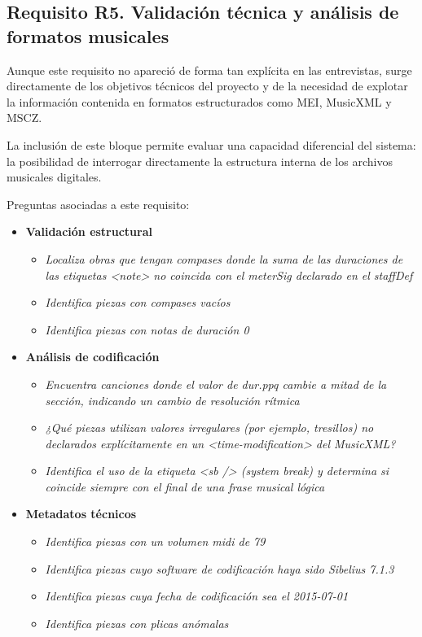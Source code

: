 \subsection{Requisito R5. Validación técnica y análisis de formatos musicales}
Aunque este requisito no apareció de forma tan explícita en las entrevistas, surge directamente de los objetivos técnicos del proyecto y de la necesidad de explotar la información contenida en formatos estructurados como MEI, MusicXML y MSCZ.

La inclusión de este bloque permite evaluar una capacidad diferencial del sistema: la posibilidad de interrogar directamente la estructura interna de los archivos musicales digitales.

Preguntas asociadas a este requisito:
\begin{itemize}
    \item \textbf{Validación estructural}
    \begin{itemize}
    \item \textit{Localiza obras que tengan compases donde la suma de las duraciones de las etiquetas <note> no coincida con el meterSig declarado en el staffDef}
    \item \textit{Identifica piezas con compases vacíos}
    \item \textit{Identifica piezas con notas de duración 0}
    \end{itemize}
    \item \textbf{Análisis de codificación}
    \begin{itemize}
    \item \textit{Encuentra canciones donde el valor de dur.ppq cambie a mitad de la sección, indicando un cambio de resolución rítmica}
    \item \textit{¿Qué piezas utilizan valores irregulares (por ejemplo, tresillos) no declarados explícitamente en un <time-modification> del MusicXML?}
    \item \textit{Identifica el uso de la etiqueta <sb /> (system break) y determina si coincide siempre con el final de una frase musical lógica}
    \end{itemize}
    \item \textbf{Metadatos técnicos}
    \begin{itemize}
    \item \textit{Identifica piezas con un volumen midi de 79}
    \item \textit{Identifica piezas cuyo software de codificación haya sido Sibelius 7.1.3}
    \item \textit{Identifica piezas cuya fecha de codificación sea el 2015-07-01}
    \item \textit{Identifica piezas con plicas anómalas}
    \end{itemize}
\end{itemize}